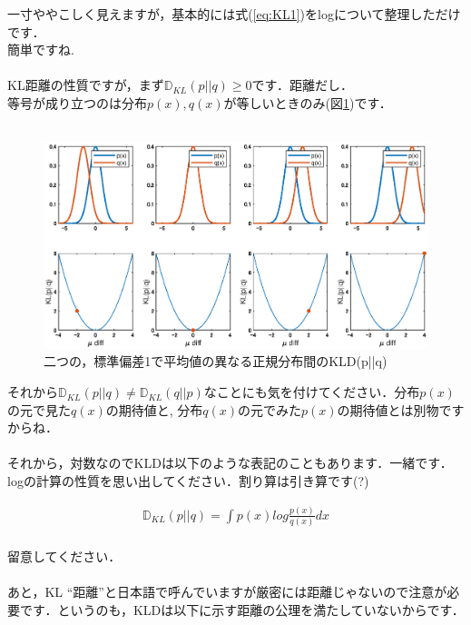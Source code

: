 \documentclass[11pt,a4paper,uplatex]{ujreport}
\begin{document}
一寸ややこしく見えますが，基本的には式(\ref{eq:KL1})をlogについて整理しただけです．\\簡単ですね.\\
\\

KL距離の性質ですが，まず$\mathbb{D}_{KL}(p||q) \geq 0$です．距離だし．\\
等号が成り立つのは分布$p(x), q(x)$が等しいときのみ(図\ref{im:kld1})です．\\
\\
\begin{figure}[H]
  \label{im:kld1}
  \centering
  \includegraphics[width=18cm]{../figures/kld.eps}
  \caption{二つの，標準偏差1で平均値の異なる正規分布間のKLD(p||q)}
\end{figure}

それから$\mathbb{D}_{KL}(p||q) \neq \mathbb{D}_{KL}(q||p)$なことにも気を付けてください．分布$p(x)$の元で見た$q(x)$の期待値と, 分布$q(x)$の元でみた$p(x)$の期待値とは別物ですからね．\\
\\

それから，対数なのでKLDは以下のような表記のこともあります．一緒です．logの計算の性質を思い出してください．割り算は引き算です(?)

\begin{eqnarray}
\label{eq:KLD-inv}
  \mathbb{D}_{KL}(p||q) =  \int p(x) log \frac{p(x)}{q(x)} dx
\end{eqnarray}
\\
留意してください．\\
\\

あと，KL ``距離''と日本語で呼んでいますが厳密には距離じゃないので注意が必要です．というのも，KLDは以下に示す距離の公理\cite{distance}を満たしていないからです．\\
\\
\end{document}
